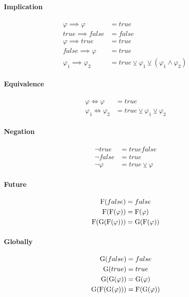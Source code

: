 \paragraph{Implication}
\begin{align}
	\varphi \implies \varphi &= true \\
	true \implies false &= false \\
	\varphi \implies true &= true \\
	false \implies \varphi &= true \\
	\varphi_1 \implies \varphi_2 &= true \veebar \varphi_1 \veebar (\varphi_1 \land \varphi_2)\  
\end{align} 

\paragraph{Equivalence}
\begin{align}
	\varphi \iff \varphi &= true \\ 
	\varphi_1 \iff \varphi_2 &= true \veebar \varphi_1 \veebar \varphi_2         
\end{align} 

\paragraph{Negation}
\begin{align}
	\neg true &= true false\\ 
	\neg false &= true \\ 
	\neg \varphi &= true \veebar \varphi 
\end{align} 

\paragraph{Future}
\begin{align}
	\text{F}(false) &= false\\ 
	\text{F}(\text{F}(\varphi)) &= \text{F}(\varphi) \\
	\text{F}(\text{G}(\text{F}(\varphi))) &= \text{G}(\text{F}(\varphi)) 
\end{align} 

\paragraph{Globally}
\begin{align}
	\text{G}(false) &= false\\ 
	\text{G}(true) &= true\\
	\text{G}(\text{G}(\varphi)) &= \text{G}(\varphi) \\    
	\text{G}(\text{F}(\text{G}(\varphi))) &= \text{F}(\text{G}(\varphi)) 
\end{align} 

